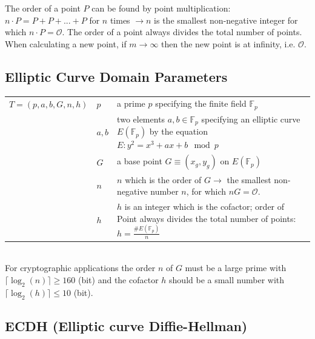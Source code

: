 The order of a point $P$ can be found by point multiplication: $n \cdot P=P+P+...+P$ for $n$ times $\to n$ is the smallest non-negative integer for which $n \cdot P=\mathcal{O}$.
The order of a point always divides the total number of points. 
When calculating a new point, if $m\to \infty$ then the new point is at infinity, i.e. $\mathcal{O}$.\\

\subsection{Elliptic Curve Domain Parameters}
\begin{tabular}{l l p{11cm}}
	$T=(p,a,b,G,n,h)$	&	$p$		&	a prime $p$ specifying the finite field $\mathbb{F}_p$ \\
						&	$a,b$	&	two elements $a,b \in \mathbb{F}_p$ specifying an elliptic curve $E(\mathbb{F}_p)$ by the equation
										$E: y^2=x^3+ax+b \mod p$ \\
						&	$G$		&	a base point $G \equiv (x_g, y_g)$ on $E(\mathbb{F}_p)$\\
						&	$n$		&	$n$ which is the order of $G \to$ the smallest non-negative number $n$, for which $nG=\mathcal{O}$.\\
						&	$h$		& 	$h$ is an integer which is the cofactor; order of Point always divides the total number of points: $h=\frac{ \#E(\mathbb{F}_p) }{n}$ \\
\end{tabular}\\

For cryptographic applications the order $n$ of $G$ must be a large prime with $\lceil \log_2(n) \rceil \geq 160$ (bit) and the cofactor $h$
should be a small number with $\lceil \log_2(h) \rceil \leq 10$ (bit).

\subsection{ECDH (Elliptic curve Diffie-Hellman)}


